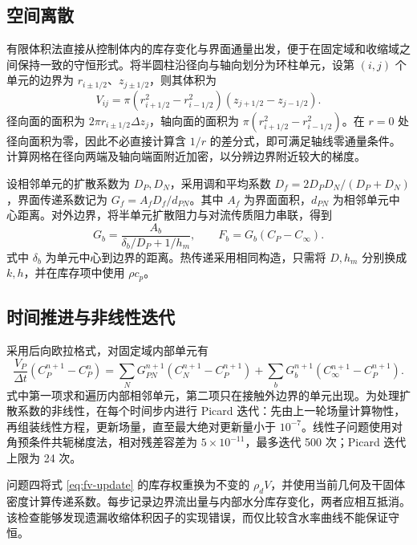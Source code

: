 \documentclass[withoutpreface,bwprint]{cumcmthesis}
\begin{document}
\subsection{空间离散}

有限体积法直接从控制体内的库存变化与界面通量出发，便于在固定域和收缩域之间保持一致的守恒形式。将半圆柱沿径向与轴向划分为环柱单元，设第 \((i,j)\) 个单元的边界为 \(r_{i\pm1/2}\)、\(z_{j\pm1/2}\)，则其体积为
\begin{equation}
V_{ij}=\pi(r_{i+1/2}^2-r_{i-1/2}^2)(z_{j+1/2}-z_{j-1/2}).
\end{equation}
径向面的面积为 \(2\pi r_{i\pm1/2}\Delta z_j\)，轴向面的面积为 \(\pi(r_{i+1/2}^2-r_{i-1/2}^2)\)。在 \(r=0\) 处径向面积为零，因此不必直接计算含 \(1/r\) 的差分式，即可满足轴线零通量条件。计算网格在径向两端及轴向端面附近加密，以分辨边界附近较大的梯度。

设相邻单元的扩散系数为 \(D_P,D_N\)，采用调和平均系数 \(D_f=2D_PD_N/(D_P+D_N)\)，界面传递系数记为 \(G_f=A_fD_f/d_{PN}\)。其中 \(A_f\) 为界面面积，\(d_{PN}\) 为相邻单元中心距离。对外边界，将半单元扩散阻力与对流传质阻力串联，得到
\begin{equation}
G_b=\frac{A_b}{\delta_b/D_P+1/h_m},\qquad
F_b=G_b(C_P-C_\infty).
\label{eq:boundary-conductance}
\end{equation}
式中 \(\delta_b\) 为单元中心到边界的距离。热传递采用相同构造，只需将 \(D,h_m\) 分别换成 \(k,h\)，并在库存项中使用 \(\rho c_p\)。

\subsection{时间推进与非线性迭代}

采用后向欧拉格式，对固定域内部单元有
\begin{equation}
\frac{V_P}{\Delta t}(C_P^{n+1}-C_P^n)
=\sum_{N}G_{PN}^{n+1}(C_N^{n+1}-C_P^{n+1})
+\sum_bG_b^{n+1}(C_\infty^{n+1}-C_P^{n+1}).
\label{eq:fv-update}
\end{equation}
式中第一项求和遍历内部相邻单元，第二项只在接触外边界的单元出现。为处理扩散系数的非线性，在每个时间步内进行 Picard 迭代：先由上一轮场量计算物性，再组装线性方程，更新场量，直至最大绝对更新量小于 \(10^{-7}\)。线性子问题使用对角预条件共轭梯度法，相对残差容差为 \(5\times10^{-11}\)，最多迭代 500 次；Picard 迭代上限为 24 次。

问题四将式 \eqref{eq:fv-update} 的库存权重换为不变的 \(\rho_d V\)，并使用当前几何及干固体密度计算传递系数。每步记录边界流出量与内部水分库存变化，两者应相互抵消。该检查能够发现遗漏收缩体积因子的实现错误，而仅比较含水率曲线不能保证守恒。
\end{document}

